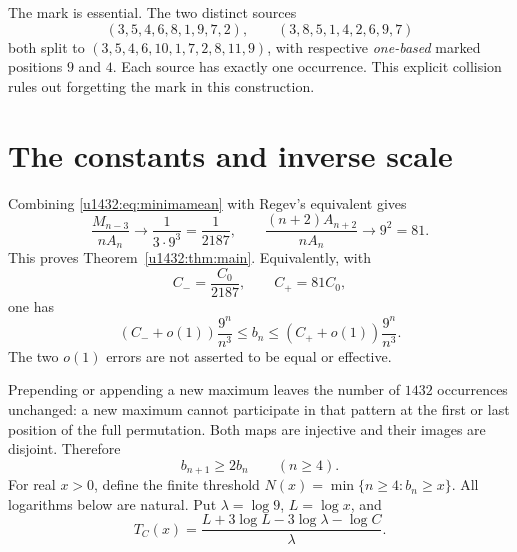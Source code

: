 \documentclass[11pt]{article}
\theoremstyle{remark}\newtheorem{remark}[theorem]{Remark}
\begin{document}
The mark is essential. The two distinct sources
\[
 (3,5,4,6,8,1,9,7,2),\qquad(3,8,5,1,4,2,6,9,7)
\]
both split to $(3,5,4,6,10,1,7,2,8,11,9)$, with respective
\emph{one-based} marked positions $9$ and $4$. Each source has exactly
one occurrence. This explicit collision rules out forgetting the mark
in this construction.

\section{The constants and inverse scale}\label{u1432:sec:inverse}
Combining \eqref{u1432:eq:minimamean} with Regev's equivalent gives
\[
 \frac{M_{n-3}}{nA_n}\longrightarrow\frac1{3\cdot9^3}
  =\frac1{2187},\qquad
 \frac{(n+2)A_{n+2}}{nA_n}\longrightarrow9^2=81.
\]
This proves Theorem~\ref{u1432:thm:main}. Equivalently, with
\begin{equation}\label{u1432:eq:constants}
 C_-=\frac{C_0}{2187},\qquad C_+=81C_0,
\end{equation}
one has
\[
 (C_-+o(1))\frac{9^n}{n^3}\le b_n
 \le(C_++o(1))\frac{9^n}{n^3}.
\]
The two $o(1)$ errors are not asserted to be equal or effective.

Prepending or appending a new maximum leaves the number of $1432$
occurrences unchanged: a new maximum cannot participate in that pattern
at the first or last position of the full permutation. Both maps are
injective and their images are disjoint. Therefore
\begin{equation}\label{u1432:eq:monotonicity}
 b_{n+1}\ge2b_n\qquad(n\ge4).
\end{equation}
For real $x>0$, define the finite threshold
$N(x)=\min\{n\ge4:b_n\ge x\}$. All logarithms below are natural.
Put $\lambda=\log9$, $L=\log x$, and
\begin{equation}\label{u1432:eq:TC}
 T_C(x)=\frac{L+3\log L-3\log\lambda-\log C}{\lambda}.
\end{equation}
\end{document}
